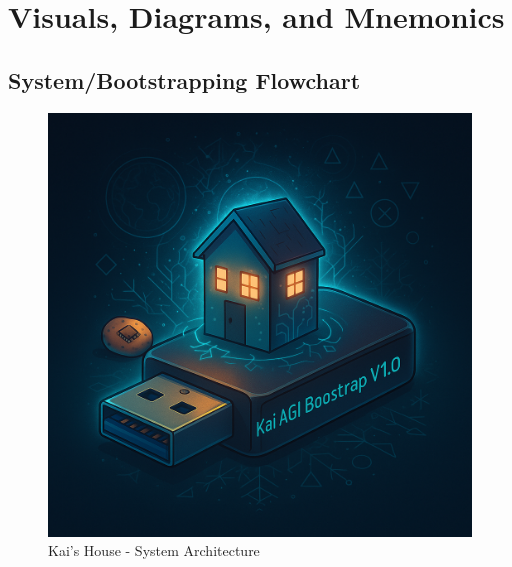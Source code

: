 \documentclass[11pt]{report}
\begin{document}
\chapter{Visuals, Diagrams, and Mnemonics}

\section{System/Bootstrapping Flowchart}
\begin{figure}[ht]
  \centering
  \includegraphics[width=\textwidth]{KaiAGIBootstrapImg.png}
  \caption{Kai's House - System Architecture}
\end{figure}
\end{document}
